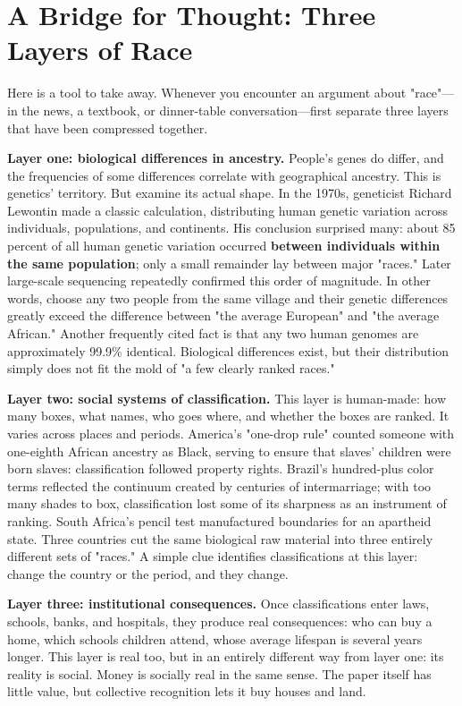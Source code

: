 \section{A Bridge for Thought: Three Layers of Race}
Here is a tool to take away. Whenever you encounter an argument about "race"---in the news, a textbook, or dinner-table conversation---first separate three layers that have been compressed together.

\textbf{Layer one: biological differences in ancestry.} People's genes do differ, and the frequencies of some differences correlate with geographical ancestry. This is genetics' territory. But examine its actual shape. In the 1970s, geneticist Richard Lewontin made a classic calculation, distributing human genetic variation across individuals, populations, and continents. His conclusion surprised many: about 85 percent of all human genetic variation occurred \textbf{between individuals within the same population}; only a small remainder lay between major "races." Later large-scale sequencing repeatedly confirmed this order of magnitude. In other words, choose any two people from the same village and their genetic differences greatly exceed the difference between "the average European" and "the average African." Another frequently cited fact is that any two human genomes are approximately 99.9\% identical. Biological differences exist, but their distribution simply does not fit the mold of "a few clearly ranked races."

\textbf{Layer two: social systems of classification.} This layer is human-made: how many boxes, what names, who goes where, and whether the boxes are ranked. It varies across places and periods. America's "one-drop rule" counted someone with one-eighth African ancestry as Black, serving to ensure that slaves' children were born slaves: classification followed property rights. Brazil's hundred-plus color terms reflected the continuum created by centuries of intermarriage; with too many shades to box, classification lost some of its sharpness as an instrument of ranking. South Africa's pencil test manufactured boundaries for an apartheid state. Three countries cut the same biological raw material into three entirely different sets of "races." A simple clue identifies classifications at this layer: change the country or the period, and they change.

\textbf{Layer three: institutional consequences.} Once classifications enter laws, schools, banks, and hospitals, they produce real consequences: who can buy a home, which schools children attend, whose average lifespan is several years longer. This layer is real too, but in an entirely different way from layer one: its reality is social. Money is socially real in the same sense. The paper itself has little value, but collective recognition lets it buy houses and land.

